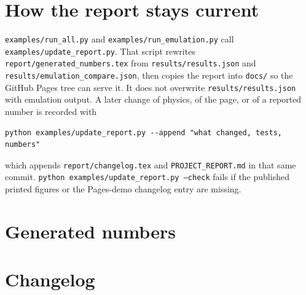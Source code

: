 \documentclass[11pt]{article}
\begin{document}
\section{How the report stays current}

\texttt{examples/run\_all.py} and \texttt{examples/run\_emulation.py} call \texttt{examples/update\_report.py}.
That script rewrites \texttt{report/generated\_numbers.tex} from \texttt{results/results.json} and \texttt{results/emulation\_compare.json}, then copies the report into \texttt{docs/} so the GitHub Pages tree can serve it.
It does not overwrite \texttt{results/results.json} with emulation output.
A later change of physics, of the page, or of a reported number is recorded with
\begin{verbatim}
python examples/update_report.py --append "what changed, tests, numbers"
\end{verbatim}
which appends \texttt{report/changelog.tex} and \texttt{PROJECT\_REPORT.md} in that same commit.
\texttt{python examples/update\_report.py --check} fails if the published printed figures or the Pages-demo changelog entry are missing.

\section{Generated numbers}


\section{Changelog}

\end{document}
